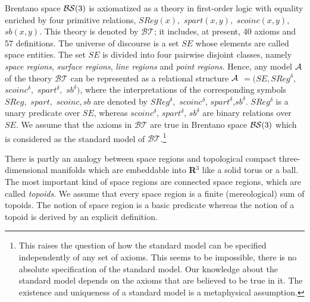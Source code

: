 \documentclass{ao2e}
\begin{document}
{Brentano space ${\cal B S} (3)$ is axiomatized as a theory in first-order logic with equality
enriched by four primitive relations, $SReg(x),$ $spart(x,y),$ $scoinc(x,y),$ $sb(x,y)$. This theory is denoted by $\mathcal{BT}$; it includes, at present, 40 axioms and 57 definitions. The universe of discourse is a set $SE$ whose elements are called space entities. The set $SE$ is divided into four pairwise disjoint classes, namely \textit{space regions}, \textit{surface regions}, \textit{line regions} and \textit{point regions}. Hence, any model ${\cal A}$ of
the theory $\mathcal{BT}$ can be represented as a relational structure  ${\cal A}$ $= (SE,SReg^{\delta},$ $scoinc^{\delta},$ $spart^{\delta},$ $sb^{\delta})$, where the interpretations of the corresponding symbols $SReg,$ $spart,$ $scoinc, sb$ are denoted by $SReg^{\delta},$ $scoinc^{\delta}$, $spart^{\delta}$,$ sb^{\delta}$. $SReg^{\delta}$ is a unary predicate over
$SE$, whereas $scoinc^{\delta}$, $ spart^{\delta}$, $sb^{\delta}$ are binary relations over $SE$. We assume that
the axioms in $\mathcal{BT}$ are true in Brentano space ${\cal B S} (3)$ which is considered as the standard model
of $\mathcal{BT}$.\footnote{This raises the question of how the standard model can be specified independently of any set
of axioms. This seems to be impossible, there is no absolute specification of the standard model. Our knowledge about the standard model depends on the axioms that are believed to be true in it. The existence and uniqueness of
a standard model is a metaphysical assumption.}

There is partly an analogy between space regions and topological compact three-dimensional manifolds which are embeddable into \textbf{R$^{3}$} like a solid torus or a ball. The most important kind of space regions are
connected space regions, which are called \textit{topoids}. We assume that every space region is a
finite (mereological) sum of topoids. 
The notion of space region is a basic predicate whereas the notion of a topoid is derived by an 
explicit definition.

}
\end{document}
